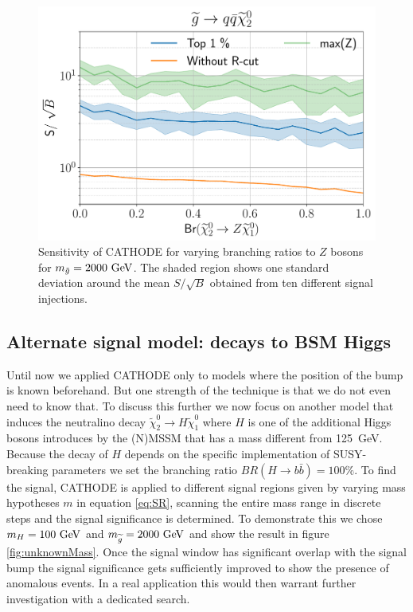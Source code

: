 \documentclass[prd, twocolumn, superscriptaddress,floatfix, nofootinbib, preprintnumbers]{revtex4-2}
\begin{document}
\begin{figure}[b]
\centering
\includegraphics[width=0.9\linewidth]{2000GeVBr.pdf}
\caption{Sensitivity of CATHODE for varying branching ratios to $Z$ bosons for $m_{\tilde{g}}=2000~{\rm GeV}$. The shaded region shows one standard deviation around the mean $S/\sqrt{B}$ obtained from ten different signal injections. }
\label{fig:ZH-BR}
\end{figure}

\subsection{Alternate signal model: decays to BSM Higgs}

Until now we applied CATHODE only to models where the position of the bump is known beforehand. But one strength of the technique is that we do not even need to know that. To discuss this further we now focus on another model that induces the neutralino decay $\widetilde{\chi}_2^0 \rightarrow H \widetilde{\chi}_1^0$ where $H$ is one of the additional Higgs bosons introduces by the (N)MSSM that has a mass different from 125~GeV. Because the decay of $H$ depends on the specific implementation of SUSY-breaking parameters we set the branching ratio $BR(H\rightarrow b \bar{b})=100\%$.
To find the signal, CATHODE is applied to different signal regions given by varying mass hypotheses $m$ in equation \ref{eq:SR}, scanning the entire mass range in discrete steps and the signal significance is determined. To demonstrate this we chose $m_H = 100~{\rm GeV}$ and $m_{\widetilde{g}}=2000~{\rm GeV}$ and show the result in figure \ref{fig:unknownMass}. Once the signal window has significant overlap with the signal bump the signal significance gets sufficiently improved to show the presence of anomalous events. In a real application this would then warrant further investigation with a dedicated search.
\end{document}
